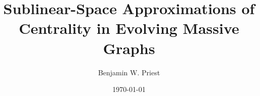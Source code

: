 \documentclass{beamer}
\title[Sublinear Centrality]{Sublinear-Space Approximations of Centrality in Evolving Massive Graphs} %
\author[Priest]{Benjamin W. Priest} %
\institute[Dartmouth] %
{
Thayer School of Engineering \\
 Dartmouth College \\ %
\medskip
\textit{benjamin.w.priest.th@dartmouth}\\ %
}
\date{\today} %
\begin{document}
\begin{frame}
\titlepage %
\end{frame}



\end{document}
